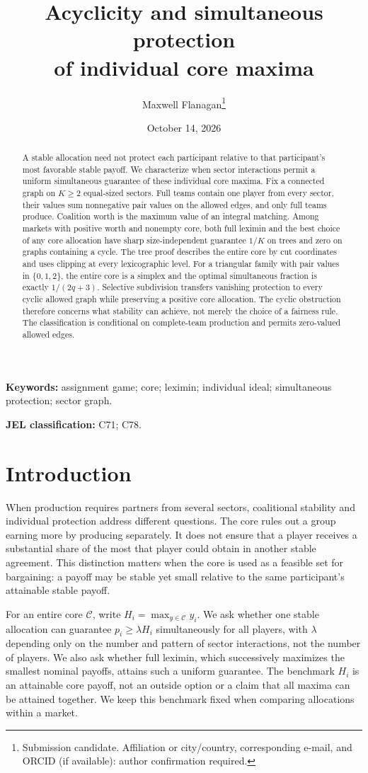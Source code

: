 \documentclass[11pt]{article}
\title{Acyclicity and simultaneous protection\\of individual core maxima}
\author{Maxwell Flanagan\thanks{Submission candidate. Affiliation or city/country,
corresponding e-mail, and ORCID (if available): author confirmation required.}}
\date{October 14, 2026}
\theoremstyle{remark}\newtheorem{remark}[theorem]{Remark}
\newcommand{\core}{\mathcal C}
\begin{document}
\maketitle
\begin{abstract}
A stable allocation need not protect each participant relative to that
participant's most favorable stable payoff. We characterize when sector
interactions permit a uniform simultaneous guarantee of these individual core
maxima. Fix a connected graph on $K\ge2$ equal-sized sectors. Full teams contain
one player from every sector, their values sum nonnegative pair values on the
allowed edges, and only full teams produce. Coalition worth is the maximum
value of an integral matching. Among markets with positive worth and nonempty
core, both full leximin and the best choice of any core allocation have sharp
size-independent guarantee $1/K$ on trees and zero on graphs containing a
cycle. The tree proof describes the entire core by cut coordinates and uses
clipping at every lexicographic level. For a triangular family with pair values
in $\{0,1,2\}$, the entire core is a simplex and the optimal simultaneous
fraction is exactly $1/(2q+3)$. Selective subdivision transfers vanishing
protection to every cyclic allowed graph while preserving a positive core
allocation. The cyclic obstruction therefore concerns what stability can
achieve, not merely the choice of a fairness rule. The classification is
conditional on complete-team production and permits zero-valued allowed edges.
\end{abstract}
\noindent\textbf{Keywords:} assignment game; core; leximin; individual ideal;
simultaneous protection; sector graph.
\par\noindent\textbf{JEL classification:} C71; C78.

\section{Introduction}
When production requires partners from several sectors, coalitional stability
and individual protection address different questions. The core rules out a
group earning more by producing separately. It does not ensure that a player
receives a substantial share of the most that player could obtain in another
stable agreement. This distinction matters when the core is used as a feasible
set for bargaining: a payoff may be stable yet small relative to the same
participant's attainable stable payoff.

For an entire core $\core$, write $H_i=\max_{y\in\core}y_i$. We ask whether
one stable allocation can guarantee $p_i\ge\lambda H_i$ simultaneously for all
players, with $\lambda$ depending only on the number and pattern of sector
interactions, not the number of players. We also ask whether full leximin,
which successively maximizes the smallest nominal payoffs, attains such a
uniform guarantee. The benchmark $H_i$ is an attainable core payoff, not an
outside option or a claim that all maxima can be attained together. We keep
this benchmark fixed when comparing allocations within a market.
\end{document}
